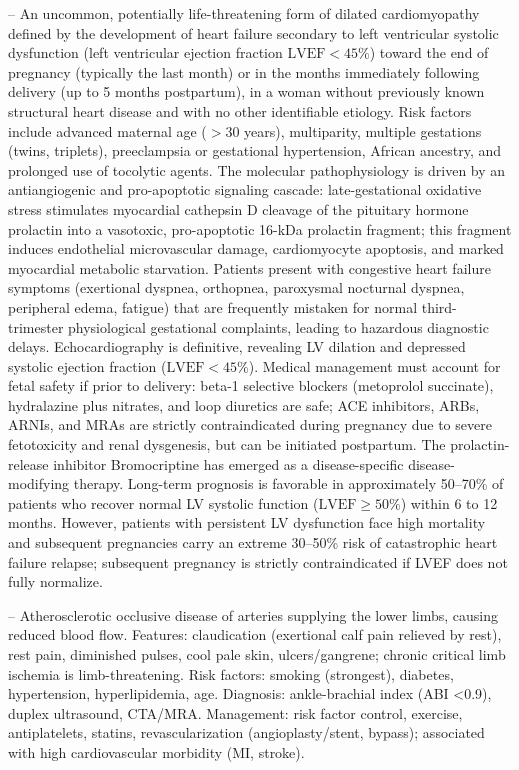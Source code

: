 -- An uncommon, potentially life-threatening form of dilated cardiomyopathy defined by the development of heart failure secondary to left ventricular systolic dysfunction (left ventricular ejection fraction $\text{LVEF} < 45\%$) toward the end of pregnancy (typically the last month) or in the months immediately following delivery (up to 5 months postpartum), in a woman without previously known structural heart disease and with no other identifiable etiology. Risk factors include advanced maternal age ($>30$ years), multiparity, multiple gestations (twins, triplets), preeclampsia or gestational hypertension, African ancestry, and prolonged use of tocolytic agents. The molecular pathophysiology is driven by an antiangiogenic and pro-apoptotic signaling cascade: late-gestational oxidative stress stimulates myocardial cathepsin D cleavage of the pituitary hormone prolactin into a vasotoxic, pro-apoptotic 16-kDa prolactin fragment; this fragment induces endothelial microvascular damage, cardiomyocyte apoptosis, and marked myocardial metabolic starvation. Patients present with congestive heart failure symptoms (exertional dyspnea, orthopnea, paroxysmal nocturnal dyspnea, peripheral edema, fatigue) that are frequently mistaken for normal third-trimester physiological gestational complaints, leading to hazardous diagnostic delays. Echocardiography is definitive, revealing LV dilation and depressed systolic ejection fraction ($\text{LVEF} < 45\%$). Medical management must account for fetal safety if prior to delivery: beta-1 selective blockers (metoprolol succinate), hydralazine plus nitrates, and loop diuretics are safe; ACE inhibitors, ARBs, ARNIs, and MRAs are strictly contraindicated during pregnancy due to severe fetotoxicity and renal dysgenesis, but can be initiated postpartum. The prolactin-release inhibitor Bromocriptine has emerged as a disease-specific disease-modifying therapy. Long-term prognosis is favorable in approximately 50--70\% of patients who recover normal LV systolic function ($\text{LVEF} \ge 50\%$) within 6 to 12 months. However, patients with persistent LV dysfunction face high mortality and subsequent pregnancies carry an extreme 30--50\% risk of catastrophic heart failure relapse; subsequent pregnancy is strictly contraindicated if LVEF does not fully normalize.

-- Atherosclerotic occlusive disease of arteries supplying the lower limbs, causing reduced blood flow. Features: claudication (exertional calf pain relieved by rest), rest pain, diminished pulses, cool pale skin, ulcers/gangrene; chronic critical limb ischemia is limb-threatening. Risk factors: smoking (strongest), diabetes, hypertension, hyperlipidemia, age. Diagnosis: ankle-brachial index (ABI <0.9), duplex ultrasound, CTA/MRA. Management: risk factor control, exercise, antiplatelets, statins, revascularization (angioplasty/stent, bypass); associated with high cardiovascular morbidity (MI, stroke).

